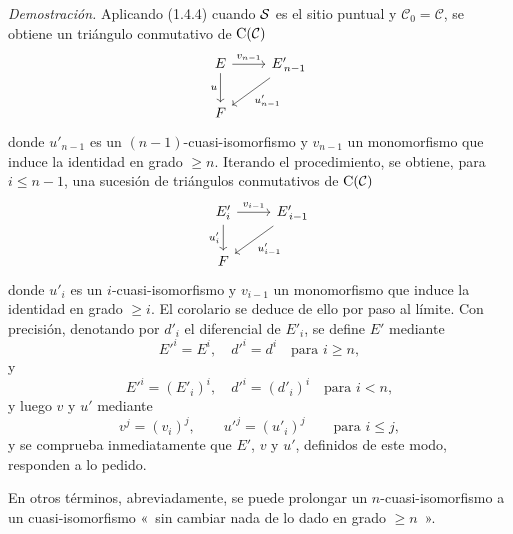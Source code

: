 \emph{Demostración.} Aplicando (1.4.4) cuando \(\sisi{S}{\mathcal S}\) es el sitio puntual y \(\mathcal C_0=\mathcal C\), se obtiene un triángulo conmutativo de \(\Cpx(\mathcal C)\)
\[
\begin{tikzcd}
E \arrow[r,"v_{n-1}"] \arrow[d,"u"'] & E'_{\,n-1} \arrow[dl,"u'_{n-1}"]\\
F &
\end{tikzcd}
\]
donde \(u'_{n-1}\) es un \((n-1)\)-cuasi-isomorfismo y \(v_{n-1}\) un monomorfismo que induce la identidad en grado \(\geq n\). Iterando el procedimiento, se obtiene, para \(i\leq n-1\), una sucesión de triángulos conmutativos de \(\Cpx(\mathcal C)\)
\[
\begin{tikzcd}
E'_i \arrow[r,"v_{i-1}"] \arrow[d,"u'_i"'] & E'_{\,i-1} \arrow[dl,"u'_{i-1}"]\\
F &
\end{tikzcd}
\]
donde \(u'_i\) es un \(i\)-cuasi-isomorfismo y \(v_{i-1}\) un monomorfismo que induce la identidad en grado \(\geq i\). El corolario se deduce de ello por paso al límite. Con precisión, denotando por \(d'_i\) el diferencial de \(E'_i\), se define \(E'\) mediante
\[
  E'^i=E^i,\quad d'^i=d^i\quad\text{para }i\geq n,
\]
y
\[
  E'^i=(E'_i)^i,\quad d'^i=(d'_i)^i\quad\text{para }i<n,
\]
y luego \(v\) y \(u'\) mediante
\[
  v^j=(v_i)^j,\qquad u'^j=(u'_i)^j\qquad\text{para }i\leq j,
\]
y se comprueba inmediatamente que \(E'\), \(v\) y \(u'\), definidos de este modo, responden a lo pedido.

En otros términos, abreviadamente, se puede prolongar un \(n\)-cuasi-isomorfismo a un cuasi-isomorfismo «~sin cambiar nada de lo dado en grado \(\geq n\)~».

